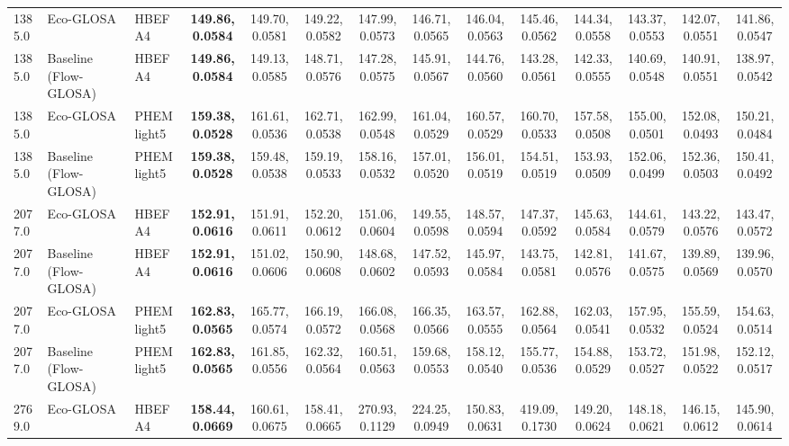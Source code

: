 \begin{table}[htb]
{\begin{tabular}{l l l *{11}{c}}
      \midrule
      1385.0 & Eco-GLOSA                 & HBEFA4       & \textbf{149.86,0.0584}   & 149.70,0.0581 & 149.22,0.0582 & 147.99,0.0573 & 146.71,0.0565 & 146.04,0.0563 & 145.46,0.0562 & 144.34,0.0558 & 143.37,0.0553 & 142.07,0.0551 & 141.86,0.0547 \\
      1385.0 & Baseline (Flow-GLOSA)     & HBEFA4       & \textbf{149.86,0.0584}   & 149.13,0.0585 & 148.71,0.0576 & 147.28,0.0575 & 145.91,0.0567 & 144.76,0.0560 & 143.28,0.0561 & 142.33,0.0555 & 140.69,0.0548 & 140.91,0.0551 & 138.97,0.0542 \\
      1385.0 & Eco-GLOSA                 & PHEMlight5   & \textbf{159.38,0.0528}   & 161.61,0.0536 & 162.71,0.0538 & 162.99,0.0548 & 161.04,0.0529 & 160.57,0.0529 & 160.70,0.0533 & 157.58,0.0508 & 155.00,0.0501 & 152.08,0.0493 & 150.21,0.0484 \\
      1385.0 & Baseline (Flow-GLOSA)     & PHEMlight5   & \textbf{159.38,0.0528}   & 159.48,0.0538 & 159.19,0.0533 & 158.16,0.0532 & 157.01,0.0520 & 156.01,0.0519 & 154.51,0.0519 & 153.93,0.0509 & 152.06,0.0499 & 152.36,0.0503 & 150.41,0.0492 \\
      \midrule
      2077.0 & Eco-GLOSA                 & HBEFA4       & \textbf{152.91,0.0616}   & 151.91,0.0611 & 152.20,0.0612 & 151.06,0.0604 & 149.55,0.0598 & 148.57,0.0594 & 147.37,0.0592 & 145.63,0.0584 & 144.61,0.0579 & 143.22,0.0576 & 143.47,0.0572 \\
      2077.0 & Baseline (Flow-GLOSA)     & HBEFA4       & \textbf{152.91,0.0616}   & 151.02,0.0606 & 150.90,0.0608 & 148.68,0.0602 & 147.52,0.0593 & 145.97,0.0584 & 143.75,0.0581 & 142.81,0.0576 & 141.67,0.0575 & 139.89,0.0569 & 139.96,0.0570 \\
      2077.0 & Eco-GLOSA                 & PHEMlight5   & \textbf{162.83,0.0565}   & 165.77,0.0574 & 166.19,0.0572 & 166.08,0.0568 & 166.35,0.0566 & 163.57,0.0555 & 162.88,0.0564 & 162.03,0.0541 & 157.95,0.0532 & 155.59,0.0524 & 154.63,0.0514 \\
      2077.0 & Baseline (Flow-GLOSA)     & PHEMlight5   & \textbf{162.83,0.0565}   & 161.85,0.0556 & 162.32,0.0564 & 160.51,0.0563 & 159.68,0.0553 & 158.12,0.0540 & 155.77,0.0536 & 154.88,0.0529 & 153.72,0.0527 & 151.98,0.0522 & 152.12,0.0517 \\
      \midrule
      2769.0 & Eco-GLOSA                 & HBEFA4       & \textbf{158.44,0.0669}   & 160.61,0.0675 & 158.41,0.0665 & 270.93,0.1129 & 224.25,0.0949 & 150.83,0.0631 & 419.09,0.1730 & 149.20,0.0624 & 148.18,0.0621 & 146.15,0.0612 & 145.90,0.0614 \\

\end{tabular}}
\end{table}
